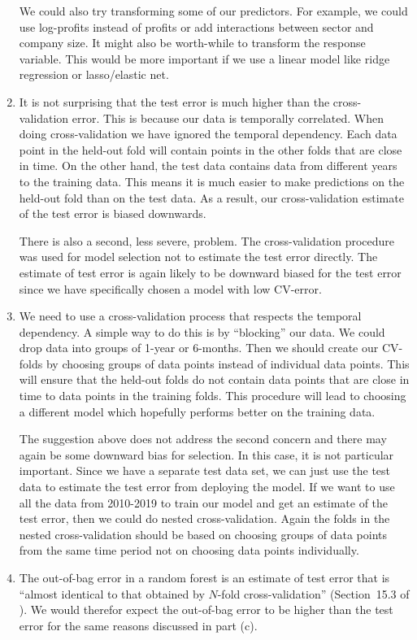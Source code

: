 \begin{enumerate}[label = (\alph*)]
    We could also try transforming some of our predictors. For example, we could use log-profits instead of profits or add interactions between sector and company size. It might also be worth-while to transform the response variable. This would be more important if we use a linear model like ridge regression or lasso/elastic net. 
    \item It is not surprising that the test error is much higher than the cross-validation error. This is because our data is temporally correlated. When doing cross-validation we have ignored the temporal dependency. Each data point in the held-out fold will contain points in the other folds that are close in time. On the other hand, the test data contains data from different years to the training data. This means it is much easier to make predictions on the held-out fold than on the test data. As a result, our cross-validation estimate of the test error is biased downwards.

    There is also a second, less severe, problem. The cross-validation procedure was used for model selection not to estimate the test error directly. The estimate of test error is again likely to be downward biased for the test error since we have specifically chosen a model with low CV-error.
    \item We need to use a cross-validation process that respects the temporal dependency. A simple way to do this is by ``blocking'' our data. We could drop data into groups of 1-year or 6-months. Then we should create our CV-folds by choosing groups of data points instead of individual data points. This will ensure that the held-out folds do not contain data points that are close in time to data points in the training folds. This procedure will lead to choosing a different model which hopefully performs better on the training data. 

    The suggestion above does not address the second concern and there may again be some downward bias for selection. In this case, it is not particular important. Since we have a separate test data set, we can just use the test data to estimate the test error from deploying the model. If we want to use all the data from 2010-2019 to train our model and get an estimate of the test error, then we could do nested cross-validation. Again the folds in the nested cross-validation should be based on choosing groups of data points from the same time period not on choosing data points individually.
    \item The out-of-bag error in a random forest is an estimate of test error that is ``almost identical to that obtained by $N$-fold cross-validation'' (Section~15.3 of \citep*{hastie2009elements}). We would therefor expect the out-of-bag error to be higher than the test error for the same reasons discussed in part (c).
\end{enumerate}


